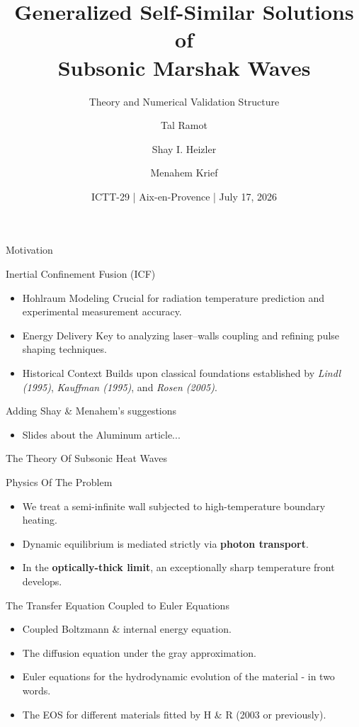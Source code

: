 \documentclass[presentation,10pt]{beamer}
\title[Subsonic Marshak Wave Fitted Solutions]{Generalized Self-Similar Solutions of \\ Subsonic Marshak Waves}
\subtitle{Theory and Numerical Validation Structure}
\author[Ramot \& Krief]{Tal Ramot \and Shay I. Heizler \and Menahem Krief}
\institute[HUJI]{
  The Hebrew University of Jerusalem, Physics dept. 
}
\date{ICTT-29 \big| Aix-en-Provence \big| July 17, 2026}
\begin{document}
\begin{frame}
  \titlepage
\end{frame}

\begin{frame}{Motivation}
  \begin{block}{Inertial Confinement Fusion (ICF)}
    \begin{itemize}
      \item Hohlraum Modeling Crucial for radiation temperature prediction and experimental measurement accuracy.
      \item Energy Delivery Key to analyzing laser--walls coupling and refining pulse shaping techniques.
      \item Historical Context Builds upon classical foundations established by \emph{Lindl (1995)}, \emph{Kauffman (1995)}, and \emph{Rosen (2005)}.
    \end{itemize}
  \end{block}

  \begin{alertblock}{Adding Shay \& Menahem's suggestions}
    \begin{itemize}
      \item Slides about the Aluminum article...
    \end{itemize}
  \end{alertblock}
\end{frame}

\begin{frame}{The Theory Of Subsonic Heat Waves}
  \begin{alertblock}{Physics Of The Problem}
    \begin{itemize}
      \item We treat a semi-infinite wall subjected to high-temperature boundary heating.
      \item Dynamic equilibrium is mediated strictly via \textbf{photon transport}.
      \item In the \textbf{optically-thick limit}, an exceptionally sharp temperature front develops.
    \end{itemize}
  \end{alertblock}

  \vspace{0.3cm}
  \begin{block}{The Transfer Equation Coupled to Euler Equations}
    \begin{itemize}
      \item Coupled Boltzmann \& internal energy equation.
      \item The diffusion equation under the gray approximation.
      \item Euler equations for the hydrodynamic evolution of the material - in two words.
      \item The EOS for different materials fitted by H \& R (2003 or previously).
    \end{itemize}
  \end{block}
\end{frame}
\end{document}

